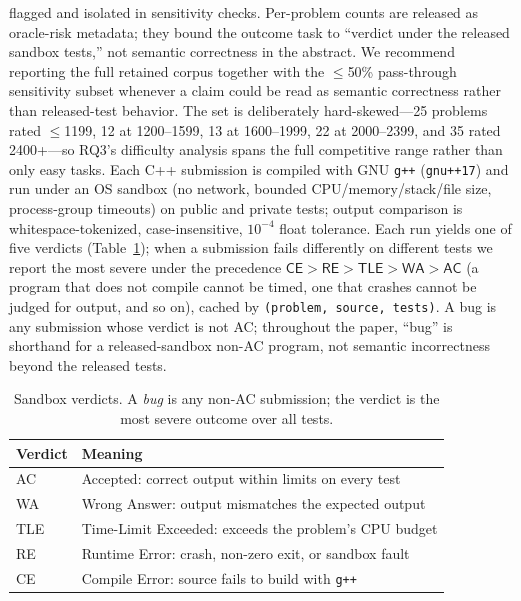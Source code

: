 \documentclass[conference]{IEEEtran}
\begin{document}
flagged and isolated in sensitivity checks. Per-problem counts are released as
oracle-risk metadata; they bound the outcome task to ``verdict under the released
sandbox tests,'' not semantic correctness in the abstract. We recommend reporting the
full retained corpus together with the $\le$50\% pass-through sensitivity subset
whenever a claim could be read as semantic correctness rather than released-test
behavior. The set is deliberately hard-skewed---25 problems rated $\le$1199, 12 at
1200--1599, 13 at 1600--1999, 22 at 2000--2399, and 35 rated 2400+---so RQ3's
difficulty analysis spans the full competitive range rather than only easy tasks.
Each C++ submission is compiled with GNU \texttt{g++} (\texttt{gnu++17})
and run under an OS sandbox (no network, bounded CPU/memory/stack/file size,
process-group timeouts) on public and private tests; output comparison is
whitespace-tokenized, case-insensitive, $10^{-4}$ float tolerance. Each run yields one
of five verdicts (Table~\ref{tab:verdictdef}); when a submission fails differently on
different tests we report the most severe under the precedence
$\textsf{CE}\!>\!\textsf{RE}\!>\!\textsf{TLE}\!>\!\textsf{WA}\!>\!\textsf{AC}$ (a
program that does not compile cannot be timed, one that crashes cannot be judged for
output, and so on), cached by \texttt{(problem, source, tests)}. A bug is any
submission whose verdict is not AC; throughout the paper, ``bug'' is shorthand for a
released-sandbox non-AC program, not semantic incorrectness beyond the released tests.

\begin{table}[t]
\centering
\caption{Sandbox verdicts. A \emph{bug} is any non-AC submission; the verdict is the
most severe outcome over all tests.}
\label{tab:verdictdef}
\begin{tabular}{ll}
\toprule
Verdict & Meaning\\
\midrule
AC  & Accepted: correct output within limits on every test\\
WA  & Wrong Answer: output mismatches the expected output\\
TLE & Time-Limit Exceeded: exceeds the problem's CPU budget\\
RE  & Runtime Error: crash, non-zero exit, or sandbox fault\\
CE  & Compile Error: source fails to build with \texttt{g++}\\
\bottomrule
\end{tabular}
\end{table}
\end{document}
